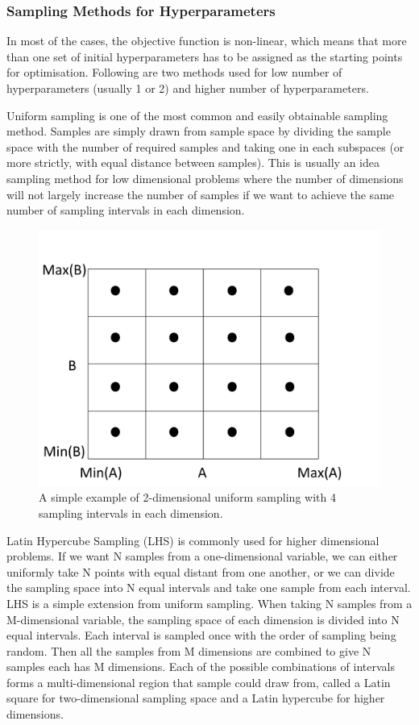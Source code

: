 \documentclass[11pt]{report}
\numberwithin{equation}{chapter}
\begin{document}
\begin{spacing}{2}
\subsubsection{Sampling Methods for Hyperparameters}
In most of the cases, the objective function is non-linear, which means that more than one set of initial hyperparameters has to be assigned as the starting points for optimisation. Following are two methods used for low number of hyperparameters (usually 1 or 2) and higher number of hyperparameters.


Uniform sampling is one of the most common and easily obtainable sampling method. Samples are simply drawn from sample space by dividing the sample space with the number of required samples and taking one in each subspaces (or more strictly, with equal distance between samples). This is usually an idea sampling method for low dimensional problems where the number of dimensions will not largely increase the number of samples if we want to achieve the same number of sampling intervals in each dimension. 

\begin{figure}
\centering
\includegraphics[scale=0.3]{Uniform_sampling.pdf}
\caption{A simple example of 2-dimensional uniform sampling with 4 sampling intervals in each dimension.}
\end{figure}


Latin Hypercube Sampling (LHS)\cite{mckay2000comparison} is commonly used for higher dimensional problems. If we want N samples from a one-dimensional variable, we can either uniformly take N points with equal distant from one another, or we can divide the sampling space into N equal intervals and take one sample from each interval. LHS is a simple extension from uniform sampling. When taking N samples from a M-dimensional variable, the sampling space of each dimension is divided into N equal intervals. Each interval is sampled once with the order of sampling being random. Then all the samples from M dimensions are combined to give N samples each has M dimensions. Each of the possible combinations of intervals forms a multi-dimensional region that sample could draw from, called a Latin square for two-dimensional sampling space and a Latin hypercube for higher dimensions. 


\end{spacing}
\end{document}
